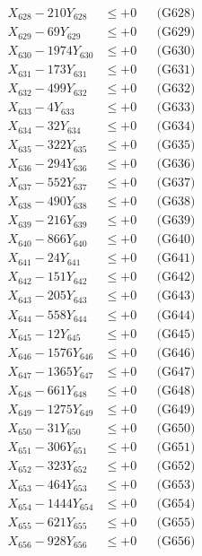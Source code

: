 \documentclass[a4paper,10pt]{article}
\begin{document}
{\begin{align}
X_{628} - 210Y_{628} &\leq +0 && \text{(G628)} \\
X_{629} - 69Y_{629} &\leq +0 && \text{(G629)} \\
X_{630} - 1974Y_{630} &\leq +0 && \text{(G630)} \\
\allowbreak
X_{631} - 173Y_{631} &\leq +0 && \text{(G631)} \\
X_{632} - 499Y_{632} &\leq +0 && \text{(G632)} \\
X_{633} - 4Y_{633} &\leq +0 && \text{(G633)} \\
X_{634} - 32Y_{634} &\leq +0 && \text{(G634)} \\
X_{635} - 322Y_{635} &\leq +0 && \text{(G635)} \\
X_{636} - 294Y_{636} &\leq +0 && \text{(G636)} \\
X_{637} - 552Y_{637} &\leq +0 && \text{(G637)} \\
X_{638} - 490Y_{638} &\leq +0 && \text{(G638)} \\
X_{639} - 216Y_{639} &\leq +0 && \text{(G639)} \\
X_{640} - 866Y_{640} &\leq +0 && \text{(G640)} \\
\allowbreak
X_{641} - 24Y_{641} &\leq +0 && \text{(G641)} \\
X_{642} - 151Y_{642} &\leq +0 && \text{(G642)} \\
X_{643} - 205Y_{643} &\leq +0 && \text{(G643)} \\
X_{644} - 558Y_{644} &\leq +0 && \text{(G644)} \\
X_{645} - 12Y_{645} &\leq +0 && \text{(G645)} \\
X_{646} - 1576Y_{646} &\leq +0 && \text{(G646)} \\
X_{647} - 1365Y_{647} &\leq +0 && \text{(G647)} \\
X_{648} - 661Y_{648} &\leq +0 && \text{(G648)} \\
X_{649} - 1275Y_{649} &\leq +0 && \text{(G649)} \\
X_{650} - 31Y_{650} &\leq +0 && \text{(G650)} \\
\allowbreak
X_{651} - 306Y_{651} &\leq +0 && \text{(G651)} \\
X_{652} - 323Y_{652} &\leq +0 && \text{(G652)} \\
X_{653} - 464Y_{653} &\leq +0 && \text{(G653)} \\
X_{654} - 1444Y_{654} &\leq +0 && \text{(G654)} \\
X_{655} - 621Y_{655} &\leq +0 && \text{(G655)} \\
X_{656} - 928Y_{656} &\leq +0 && \text{(G656)} \\

\end{align}}
\end{document}
